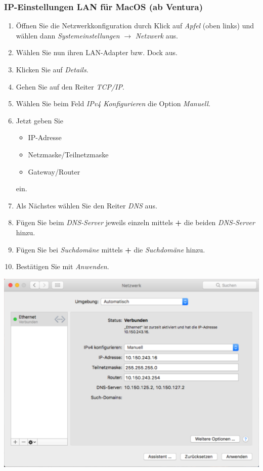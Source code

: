 \documentclass[a4paper,12pt]{scrartcl}
\begin{document}
\subsubsection*{IP-Einstellungen LAN für MacOS (ab Ventura)}

\begin{minipage}{0.57\textwidth}
	\begin{enumerate}
		\item Öffnen Sie die Netzwerkkonfiguration durch Klick auf \emph{Apfel} (oben links) und wählen dann \emph{Systemeinstellungen} $\rightarrow$ \emph{Netzwerk} aus.
		\item Wählen Sie nun ihren LAN-Adapter bzw. Dock aus.
		\item Klicken Sie auf \textit{Details}.
		\item Gehen Sie auf den Reiter \textit{TCP/IP}.
		\item Wählen Sie beim Feld \textit{IPv4 Konfigurieren} die Option \textit{Manuell}.
		\item Jetzt geben Sie
		\begin{itemize}
			\item IP-Adresse
			\item Netzmaske/Teilnetzmaske
			\item Gateway/Router
		\end{itemize}
	ein.
	\item Als Nächstes wählen Sie den Reiter \textit{DNS} aus.
	\item Fügen Sie beim \textit{DNS-Server} jeweils einzeln mittels \textbf{+} die beiden \textit{DNS-Server} hinzu.
	\item Fügen Sie bei \textit{Suchdomäne} mittels \textbf{+} die \textit{Suchdomäne} hinzu.
	\item Bestätigen Sie mit \emph{Anwenden}.
	\end{enumerate}
\end{minipage}
\hfill
\begin{minipage}{0.4\textwidth}
	\centering
	\includegraphics[width=\linewidth,keepaspectratio]{Bilder/IP_MAC}
\end{minipage}
\end{document}
